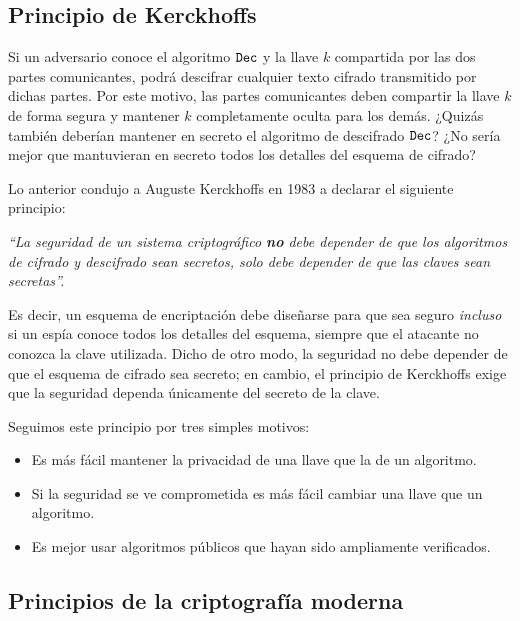 \subsection{Principio de Kerckhoffs}
Si un adversario conoce el algoritmo $\texttt{Dec}$ y la llave $k$ compartida por las dos partes comunicantes, podrá descifrar cualquier texto cifrado transmitido por dichas partes. Por este motivo, las partes comunicantes deben compartir la llave $k$ de forma segura y mantener $k$ completamente oculta para los demás. ¿Quizás también deberían mantener en secreto el algoritmo de descifrado $\texttt{Dec}$? ¿No sería mejor que mantuvieran en secreto todos los detalles del esquema de cifrado? \medbreak

Lo anterior condujo a Auguste Kerckhoffs en 1983 a declarar el siguiente principio:
\begin{center}
    \textit{``La seguridad de un sistema criptográfico \textbf{no} debe depender de que los algoritmos de cifrado y descifrado sean secretos, solo debe depender de que las claves sean secretas''.}
\end{center}

Es decir, un esquema de encriptación debe diseñarse para que sea seguro \textit{incluso} si un espía conoce todos los detalles del esquema, siempre que el atacante no conozca la clave utilizada. Dicho de otro modo, la seguridad no debe depender de que el esquema de cifrado sea secreto; en cambio, el principio de Kerckhoffs exige que la seguridad dependa únicamente del secreto de la clave. \medbreak

Seguimos este principio por tres simples motivos:
\begin{itemize}
    \item Es más fácil mantener la privacidad de una llave que la de un algoritmo.
    \item Si la seguridad se ve comprometida es más fácil cambiar una llave que un algoritmo.
    \item Es mejor usar algoritmos públicos que hayan sido ampliamente verificados.
\end{itemize}

\subsection{Principios de la criptografía moderna}

